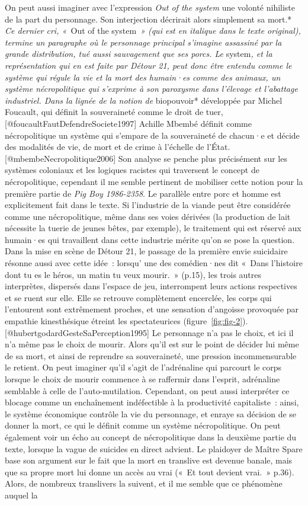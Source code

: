 \documentclass[
]{article}
\begin{document}
On peut aussi imaginer avec l'expression \emph{Out of the system }une volonté nihiliste de la part du personnage. Son interjection décrirait alors simplement sa mort.* \emph{Ce dernier cri, «~}Out of the system~\emph{» (qui est en italique dans le texte original), termine un paragraphe où le personnage principal s'imagine assassiné par la grande distribution, tué aussi sauvagement que ses porcs. Le }system\emph{, et la représentation qui en est faite par Détour 21, peut donc être entendu comme le système qui régule la vie et la mort des humain·es comme des animaux, un système nécropolitique qui s'exprime à son paroxysme dans l'élevage et l'abattage industriel. Dans la lignée de la notion de }biopouvoir* développée par Michel Foucault, qui définit la souveraineté comme le droit de tuer,{[}@foucaultFautDefendreSociete1997{]} Achille Mbembé définit comme nécropolitique un système qui s'empare de la souveraineté de chacun·e et décide des modalités de vie, de mort et de crime à l'échelle de l'État.{[}@mbembeNecropolitique2006{]} Son analyse se penche plus précisément sur les systèmes coloniaux et les logiques racistes qui traversent le concept de nécropolitique, cependant il me semble pertinent de mobiliser cette notion pour la première partie de \emph{Pig Boy 1986-2358}. Le parallèle entre porc et homme est explicitement fait dans le texte. Si l'industrie de la viande peut être considérée comme une nécropolitique, même dans ses voies dérivées (la production de lait nécessite la tuerie de jeunes bêtes, par exemple), le traitement qui est réservé aux humain·es qui travaillent dans cette industrie mérite qu'on se pose la question. Dans la mise en scène de Détour 21, le passage de la première envie suicidaire résonne aussi avec cette idée~: lorsqu' une des comédien·nes dit «~Dans l'histoire dont tu es le héros, un matin tu veux mourir.~» (p.15), les trois autres interprètes, dispersés dans l'espace de jeu, interrompent leurs actions respectives et se ruent sur elle. Elle se retrouve complètement encerclée, les corps qui l'entourent sont extrêmement proches, et une sensation d'angoisse provoquée par empathie kinesthésique étreint les spectateurices (figure~\ref{fig:fig-2}).{[}@hubertgodardGesteSaPerception1995{]} Le personnage n'a pas le choix, et ici il n'a même pas le choix de mourir. Alors qu'il est sur le point de décider lui même de sa mort, et ainsi de reprendre sa souveraineté, une pression incommensurable le retient. On peut imaginer qu'il s'agit de l'adrénaline qui parcourt le corps lorsque le choix de mourir commence à se raffermir dans l'esprit, adrénaline semblable à celle de l'auto-mutilation. Cependant, on peut aussi interpréter ce blocage comme un enchaînement indéfectible à la productivité capitaliste~: ainsi, le système économique contrôle la vie du personnage, et enraye sa décision de se donner la mort, ce qui le définit comme un système nécropolitique. On peut également voir un écho au concept de nécropolitique dans la deuxième partie du texte, lorsque la vague de suicides en direct advient. Le plaidoyer de Maître Spare base son argument sur le fait que la mort en translive est devenue banale, mais que sa propre mort lui donne un accès au vrai («~Et tout devient vrai.~» p.36). Alors, de nombreux translivers la suivent, et il me semble que ce phénomène auquel la 
\end{document}
